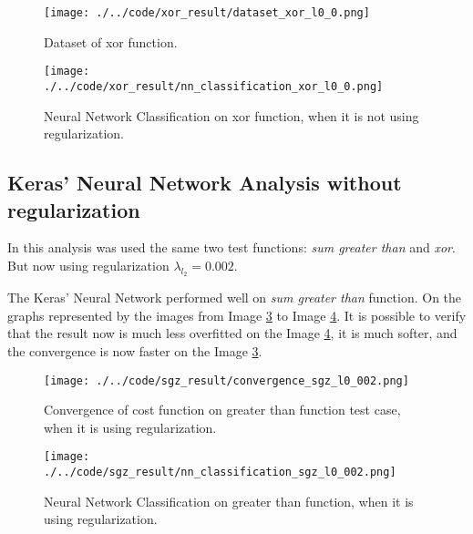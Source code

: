 \documentclass[journal]{IEEEtran}
\begin{document}
\begin{figure}
  \begin{center}
  \texttt{[image: ./../code/xor\_result/dataset\_xor\_l0\_0.png]}
  \caption{Dataset of xor function.}
  \label{img:xor_data_set}
  \end{center}
\end{figure}

\begin{figure}
    \begin{center}
    \texttt{[image: ./../code/xor\_result/nn\_classification\_xor\_l0\_0.png]}
    \caption{Neural Network Classification on xor function, when it is not using regularization.}
    \label{img:xor_classification_no_reg}
    \end{center}
\end{figure}

\subsection{Keras' Neural Network Analysis without regularization}

In this analysis was used the same two test functions: \textit{sum greater than} and \textit{xor}. But now using regularization $\lambda_{l_2} = 0.002$.

The Keras' Neural Network performed well on \textit{sum greater than} function. On the graphs represented by the images from Image \ref{img:greater_cost_reg} to Image \ref{img:greater_classification_reg}. It is possible to verify that the result now is much less overfitted on the Image \ref{img:greater_classification_reg}, it is much softer, and the convergence is now faster on the Image \ref{img:greater_cost_reg}.

\begin{figure}
  \begin{center}
  \texttt{[image: ./../code/sgz\_result/convergence\_sgz\_l0\_002.png]}
  \caption{Convergence of cost function on greater than function test case, when it is using regularization.}
  \label{img:greater_cost_reg}
  \end{center}
\end{figure}

\begin{figure}
    \begin{center}
    \texttt{[image: ./../code/sgz\_result/nn\_classification\_sgz\_l0\_002.png]}
    \caption{Neural Network Classification on greater than function, when it is using regularization.}
    \label{img:greater_classification_reg}
    \end{center}
\end{figure}
\end{document}
